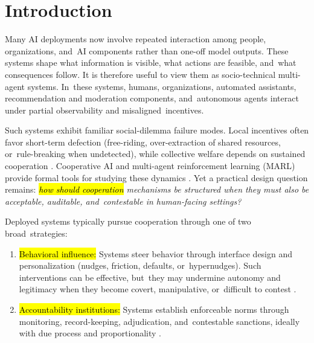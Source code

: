 \documentclass[mca,article,accept,pdftex,oneauthor]{Definitions/mdpi}
\begin{document}
\section{Introduction}
\label{sec:intro}

Many AI deployments now involve repeated interaction among people, organizations, and~AI components rather than one-off model outputs. These systems shape what information is visible, what actions are feasible, and~what consequences follow. It is therefore useful to view them as socio-technical multi-agent systems. In~these systems, humans, organizations, automated assistants, recommendation and moderation components, and~autonomous agents interact under partial observability and misaligned~incentives.

Such systems exhibit familiar social-dilemma failure modes. Local incentives often favor short-term defection (free-riding, over-extraction of shared resources, or~rule-breaking when undetected), while collective welfare depends on sustained cooperation \citep{Ostrom1990,Leibo2017SSD}. Cooperative AI and multi-agent reinforcement learning (MARL) provide formal tools for studying these dynamics \citep{Dafoe2020CooperativeAI,Leibo2021MeltingPot}. Yet a practical design question remains: \emph{\hl{how should cooperation} %
 mechanisms be structured when they must also be acceptable, auditable, and~contestable in human-facing settings?}

Deployed systems typically pursue cooperation through one of two broad~strategies:
\begin{enumerate}[leftmargin=*]
\item \hl{Behavioral influence:} %
 Systems steer behavior through interface design and personalization (nudges, friction, defaults, or~hypernudges). Such interventions can be effective, but~they may undermine autonomy and legitimacy when they become covert, manipulative, or~difficult to contest \citep{ThalerSunstein2008,Yeung2017Hypernudge,SusserRoesslerNissenbaum2019,Gray2018DarkPatterns,Mathur2019DarkPatternsScale}.
\item \hl{Accountability institutions:} Systems establish enforceable norms through monitoring, record-keeping, adjudication, and~contestable sanctions, ideally with due process and proportionality \citep{Ostrom1990,Tyler1990,Kroll2017AccountableAlgorithms,Raji2020Auditing}.
\end{enumerate}
\end{document}
